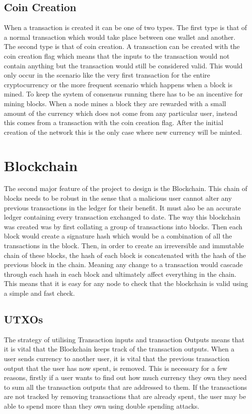 \documentclass{l4proj}
\begin{document}
\subsection{Coin Creation}
When a transaction is created it can be one of two types. The first type is that of a normal transaction which would take place
between one wallet and another. The second type is that of coin creation. A transaction can be created with the 
coin creation flag which means that the inputs to the transaction would not contain anything but the transaction
would still be considered valid. This would only occur in the scenario like the very first transaction for the entire
cryptocurrency or the more frequent scenario which happens when a block is mined. To keep the system of consensus 
running there has to be an incentive for mining blocks. When a node mines a block they are rewarded with a small
amount of the currency which does not come from any particular user, instead this comes from a transaction with the
coin creation flag. After the initial creation of the network this is the only case where new currency will be
minted.


\section{Blockchain}
The second major feature of the project to design is the Blockchain. This chain of blocks needs to be robust in
the sense that a malicious user cannot alter any previous transactions in the ledger for their benefit. It must
also be an accurate ledger containing every transaction exchanged to date. The way this blockchain was created was
by first collating a group of transactions into blocks. Then each block would create a signature hash which would
be a combination of all the transactions in the block. Then, in order to create an irreversible and immutable chain
of these blocks, the hash of each block is concatenated with the hash of the previous block in the chain. Meaning
any change to a transaction would cascade through each hash in each block and ultimately affect everything in the
chain. This means that it is easy for any node to check that the blockchain is valid using a simple and fast check.



\subsection{UTXOs}
The strategy of utilising Transaction inputs and transaction Outputs means that it is vital that the Blockchain
keeps track of the transaction outputs. When a user sends currency to another user, it is vital that the previous 
transaction output that the user has now spent, is removed. This is necessary for a few reasons, 
firstly if a user wants to find out how much currency they own they need to sum all the transaction outputs that 
are addressed to them. If the transactions are not tracked by removing transactions that are already spent, the 
user may be able to spend more than they own using double spending attacks.
\end{document}
